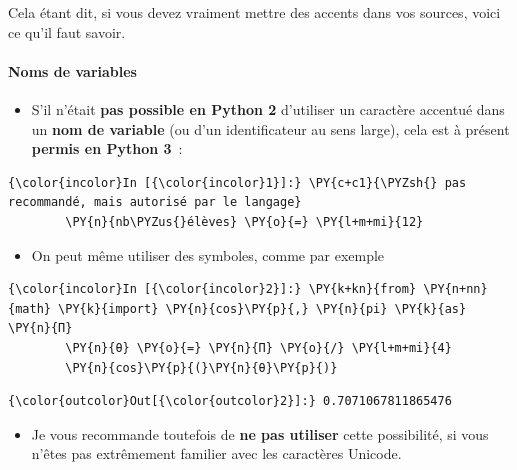     Cela étant dit, si vous devez vraiment mettre des accents dans vos
sources, voici ce qu'il faut savoir.

    \hypertarget{noms-de-variables}{%
\paragraph{Noms de variables}\label{noms-de-variables}}

    \begin{itemize}
\tightlist
\item
  S'il n'était \textbf{pas possible en Python 2} d'utiliser un caractère
  accentué dans un \textbf{nom de variable} (ou d'un identificateur au
  sens large), cela est à présent \textbf{permis en Python 3}~:
\end{itemize}

    \begin{Verbatim}[commandchars=\\\{\}]
{\color{incolor}In [{\color{incolor}1}]:} \PY{c+c1}{\PYZsh{} pas recommandé, mais autorisé par le langage}
        \PY{n}{nb\PYZus{}élèves} \PY{o}{=} \PY{l+m+mi}{12}
\end{Verbatim}


    \begin{itemize}
\tightlist
\item
  On peut même utiliser des symboles, comme par exemple
\end{itemize}

    \begin{Verbatim}[commandchars=\\\{\}]
{\color{incolor}In [{\color{incolor}2}]:} \PY{k+kn}{from} \PY{n+nn}{math} \PY{k}{import} \PY{n}{cos}\PY{p}{,} \PY{n}{pi} \PY{k}{as} \PY{n}{Π}
        \PY{n}{θ} \PY{o}{=} \PY{n}{Π} \PY{o}{/} \PY{l+m+mi}{4}
        \PY{n}{cos}\PY{p}{(}\PY{n}{θ}\PY{p}{)}
\end{Verbatim}


\begin{Verbatim}[commandchars=\\\{\}]
{\color{outcolor}Out[{\color{outcolor}2}]:} 0.7071067811865476
\end{Verbatim}
            
\begin{itemize}
\tightlist
\item
  Je vous recommande toutefois de \textbf{ne pas utiliser} cette
  possibilité, si vous n'êtes pas extrêmement familier avec les
  caractères Unicode.
\end{itemize}

